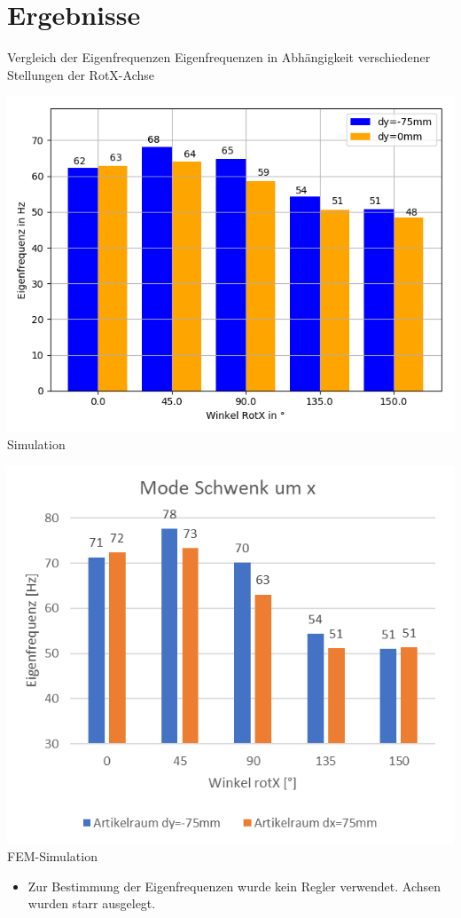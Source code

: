 \documentclass[10pt,xcolor=dvipsnames]{beamer}
\begin{document}
\section{Ergebnisse}
	\begin{frame}{Vergleich der Eigenfrequenzen}
		Eigenfrequenzen in Abhängigkeit verschiedener Stellungen der RotX-Achse\\\vspace{0.5cm}
		\begin{minipage}{0.48\textwidth}
			\centering
			\includegraphics[width=0.99\linewidth]{./pics/eigenfreq_test.png}
			Simulation
		\end{minipage}
		\hfill
		\begin{minipage}{0.48\textwidth}
			\centering
			\includegraphics[width=0.99\linewidth]{./pics/eigenfreq_ref.png}
			FEM-Simulation
		\end{minipage}
	\vspace{0.5cm}
		\begin{itemize}
			\item Zur Bestimmung der Eigenfrequenzen wurde kein Regler verwendet. Achsen wurden starr ausgelegt.
		\end{itemize}
	\end{frame}
\end{document}
